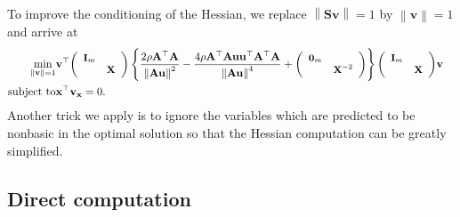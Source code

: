 \documentclass{article}
\newcommand{\x}{\mathbf{x}}
\newcommand{\A}{\mathbf{A}}
\newcommand{\0}{\textbf{0}}
\newcommand{\X}{\mathbf{X}}
\newcommand{\I}{\mathbf{I}}
\newcommand{\tmu}{\mathbf{u}}
\newcommand{\bs}{\mathbf{S}}
\newcommand{\tmv}{\mathbf{v}}
\begin{document}
To improve the conditioning of the Hessian, we replace $\left\| \bs \tmv
\right\| = 1$ by $\left\| \tmv \right\| = 1$ and arrive at
\begin{eqnarray*}
  \min_{\left\| \tmv \right\| = 1} & \tmv^{\top}
  \small{\left(\begin{array}{cc}
    \I_m & \\
    & \X
  \end{array}\right)} \left\{ \frac{2 \rho \A^{\top} \A}{\left\| \A \tmu
  \right\|^2} - \frac{4 \rho \A^{\top} \A \tmu \tmu^{\top} \A^{\top}
  \A}{\left\| \A \tmu \right\|^4} + \small{\left(\begin{array}{cc}
    \0_m & \\
    & \X^{- 2}
  \end{array}\right)} \right\} \small{\left(\begin{array}{cc}
    \I_m & \\
    & \X
  \end{array}\right)} \tmv & \\
  \text{subject to} & \x^{\top} \tmv_{\x} = 0. & 
\end{eqnarray*}
Another trick we apply is to ignore the variables which are predicted to be
nonbasic in the optimal solution so that the Hessian computation can be
greatly simplified.

\subsection{Direct computation}
\end{document}
